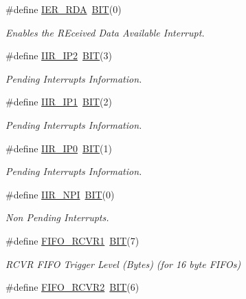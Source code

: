 \begin{DoxyCompactItemize}
\#define \hyperlink{group___serial_gacc2bd3737c0687e576384afc1a37a0cc}{I\+E\+R\+\_\+\+R\+DA}~\hyperlink{group___serial_ga3a8ea58898cb58fc96013383d39f482c}{B\+IT}(0)
\begin{DoxyCompactList}\small\item\em Enables the R\+Eceived Data Available Interrupt. \end{DoxyCompactList}\item 
\#define \hyperlink{group___serial_ga62a27224c8cece6052419d605737fd1e}{I\+I\+R\+\_\+\+I\+P2}~\hyperlink{group___serial_ga3a8ea58898cb58fc96013383d39f482c}{B\+IT}(3)
\begin{DoxyCompactList}\small\item\em Pending Interrupts Information. \end{DoxyCompactList}\item 
\#define \hyperlink{group___serial_ga25fc1de85f4df9dc8249e52bdc25f73d}{I\+I\+R\+\_\+\+I\+P1}~\hyperlink{group___serial_ga3a8ea58898cb58fc96013383d39f482c}{B\+IT}(2)
\begin{DoxyCompactList}\small\item\em Pending Interrupts Information. \end{DoxyCompactList}\item 
\#define \hyperlink{group___serial_ga404030d0e2acaec8bd39b8a9b01daf83}{I\+I\+R\+\_\+\+I\+P0}~\hyperlink{group___serial_ga3a8ea58898cb58fc96013383d39f482c}{B\+IT}(1)
\begin{DoxyCompactList}\small\item\em Pending Interrupts Information. \end{DoxyCompactList}\item 
\#define \hyperlink{group___serial_ga801f50fdaed5e1d41cc8606b06a4f993}{I\+I\+R\+\_\+\+N\+PI}~\hyperlink{group___serial_ga3a8ea58898cb58fc96013383d39f482c}{B\+IT}(0)
\begin{DoxyCompactList}\small\item\em Non Pending Interrupts. \end{DoxyCompactList}\item 
\#define \hyperlink{group___serial_gadd8802975b6d7cbf87ae7fcf8256baa2}{F\+I\+F\+O\+\_\+\+R\+C\+V\+R1}~\hyperlink{group___serial_ga3a8ea58898cb58fc96013383d39f482c}{B\+IT}(7)
\begin{DoxyCompactList}\small\item\em R\+C\+VR F\+I\+FO Trigger Level (Bytes) (for 16 byte F\+I\+F\+Os) \end{DoxyCompactList}\item 
\#define \hyperlink{group___serial_ga10947413fec5094d1e649a4764ce752a}{F\+I\+F\+O\+\_\+\+R\+C\+V\+R2}~\hyperlink{group___serial_ga3a8ea58898cb58fc96013383d39f482c}{B\+IT}(6)

\end{DoxyCompactItemize}
